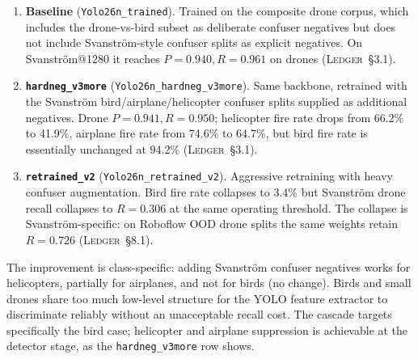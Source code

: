\begin{enumerate}
    \item \textbf{Baseline} (\texttt{Yolo26n\_trained}). Trained on the composite drone corpus, which includes the drone-vs-bird subset as deliberate confuser negatives but does not include Svanstr\"om-style confuser splits as explicit negatives. On Svanstr\"om@1280 it reaches $P=0.940, R=0.961$ on drones (\textsc{Ledger}~\S3.1).
    \item \textbf{\texttt{hardneg\_v3more}} (\texttt{Yolo26n\_hardneg\_v3more}). Same backbone, retrained with the Svanstr\"om bird/airplane/helicopter confuser splits supplied as additional negatives. Drone $P=0.941, R=0.950$; helicopter fire rate drops from 66.2\% to 41.9\%, airplane fire rate from 74.6\% to 64.7\%, but bird fire rate is essentially unchanged at 94.2\% (\textsc{Ledger}~\S3.1).
    \item \textbf{\texttt{retrained\_v2}} (\texttt{Yolo26n\_retrained\_v2}). Aggressive retraining with heavy confuser augmentation. Bird fire rate collapses to 3.4\% but Svanstr\"om drone recall collapses to $R=0.306$ at the same operating threshold. The collapse is Svanstr\"om-specific: on Roboflow OOD drone splits the same weights retain $R=0.726$ (\textsc{Ledger}~\S8.1).
\end{enumerate}

The improvement is class-specific: adding Svanstr\"om confuser negatives works for helicopters, partially for airplanes, and not for birds (no change). Birds and small drones share too much low-level structure for the YOLO feature extractor to discriminate reliably without an unacceptable recall cost. The cascade targets specifically the bird case; helicopter and airplane suppression is achievable at the detector stage, as the \texttt{hardneg\_v3more} row shows.

